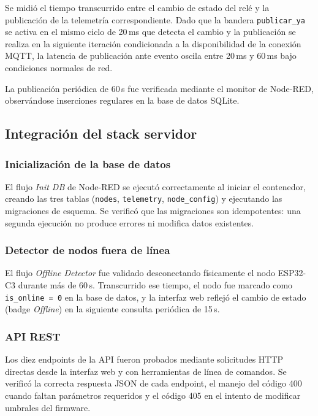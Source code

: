 Se midió el tiempo transcurrido entre el cambio de estado del relé y la publicación
de la telemetría correspondiente. Dado que la bandera \texttt{publicar\_ya} se
activa en el mismo ciclo de 20\,ms que detecta el cambio y la publicación se
realiza en la siguiente iteración condicionada a la disponibilidad de la conexión
MQTT, la latencia de publicación ante evento oscila entre 20\,ms y 60\,ms bajo
condiciones normales de red.

La publicación periódica de 60\,s fue verificada mediante el monitor de
Node-RED, observándose inserciones regulares en la base de datos SQLite.

\subsection{Integración del stack servidor}

\subsubsection{Inicialización de la base de datos}

El flujo \textit{Init DB} de Node-RED se ejecutó correctamente al iniciar el
contenedor, creando las tres tablas (\texttt{nodes}, \texttt{telemetry},
\texttt{node\_config}) y ejecutando las migraciones de esquema. Se verificó que
las migraciones son idempotentes: una segunda ejecución no produce errores ni
modifica datos existentes.

\subsubsection{Detector de nodos fuera de línea}

El flujo \textit{Offline Detector} fue validado desconectando físicamente el nodo
ESP32-C3 durante más de 60\,s. Transcurrido ese tiempo, el nodo fue marcado como
\texttt{is\_online = 0} en la base de datos, y la interfaz web reflejó el cambio
de estado (badge \textit{Offline}) en la siguiente consulta periódica de 15\,s.

\subsubsection{API REST}

Los diez endpoints de la API fueron probados mediante solicitudes HTTP directas
desde la interfaz web y con herramientas de línea de comandos. Se verificó la
correcta respuesta JSON de cada endpoint, el manejo del código 400 cuando faltan
parámetros requeridos y el código 405 en el intento de modificar umbrales del
firmware.

